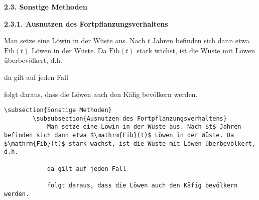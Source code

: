 \documentclass["WS\space 16-17\space -\space LaTeX-Kurs\space -\space Praesentation\space -\space 1.tex"]{subfiles}
\begin{document}
\begin{frame}[fragile]
	\vspace{-0.2cm}\Losung
	\begin{outputbox}
	    { \Large\textbf{2.3. Sonstige Methoden}}
			
	    { \large\textbf{2.3.1. Ausnutzen des Fortpflanzungsverhaltens}}  
	
	    Man setze eine Löwin in der Wüste aus. Nach $t$ Jahren befinden sich dann etwa $\mathrm{Fib}(t)$ Löwen in der Wüste. Da $\mathrm{Fib}(t)$ stark wächst, ist die Wüste mit Löwen überbevölkert, d.h.
	
	    da gilt auf jeden Fall
	
	    folgt daraus, dass die Löwen auch den Käfig bevölkern werden.
		   \vspace{-0.1cm}
	\end{outputbox}

	\vspace{-0.2cm}\Code
	\begin{lstlisting}[gobble=4]
    \subsection{Sonstige Methoden}
	    \subsubsection{Ausnutzen des Fortpflanzungsverhaltens}
			Man setze eine Löwin in der Wüste aus. Nach $t$ Jahren befinden sich dann etwa $\mathrm{Fib}(t)$ Löwen in der Wüste. Da $\mathrm{Fib}(t)$ stark wächst, ist die Wüste mit Löwen überbevölkert, d.h.

		    da gilt auf jeden Fall

		    folgt daraus, dass die Löwen auch den Käfig bevölkern werden.
	\end{lstlisting}
\end{frame}
\end{document}
